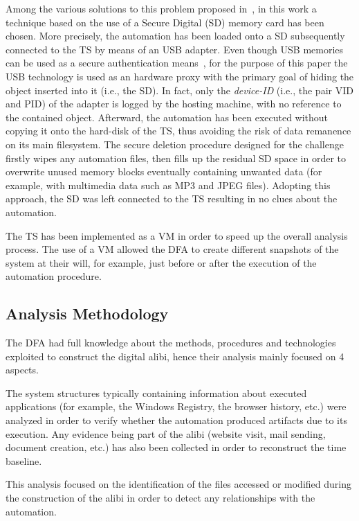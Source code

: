 \documentclass[10pt, conference]{IEEEtran}
\begin{document}
Among the various solutions to this problem proposed in~\cite{securedel}, in this work a technique based on the use of a Secure Digital
(SD) memory card has been chosen. More precisely, the automation has been loaded onto a SD subsequently connected to the TS by
means of an USB adapter. 
Even though USB memories can be used as a secure authentication means~\cite{jowua_usb}, for the purpose of this paper the USB technology is used as an hardware proxy with the primary goal of hiding the object inserted into it (i.e., the SD). In fact, only the \emph{device-ID} (i.e., the pair VID and PID) of the adapter is logged by the hosting machine, with no reference to the contained object.
Afterward, the automation has been executed without copying it onto the hard-disk of the TS, thus avoiding
the risk of data remanence on its main filesystem. The secure deletion procedure designed for the challenge firstly wipes any automation
files, then fills up the residual SD space in order to overwrite unused memory blocks eventually containing unwanted data (for example,
with multimedia data such as MP3 and JPEG files). Adopting this approach, the SD was left connected to the TS resulting in no clues
about the automation.

The TS has been implemented as a VM in order to speed up the overall analysis process. The use of a VM allowed
the DFA to create different snapshots of the system at their will, for example, just before or after the execution of the automation procedure.

\subsection{Analysis Methodology}
The DFA had full knowledge about the methods, procedures and technologies exploited to construct the digital alibi, hence their
analysis mainly focused on 4 aspects.

 The system structures typically containing information about executed
applications (for example, the Windows Registry, the browser history, etc.) were analyzed in order to verify whether the automation
produced artifacts due to its execution. Any evidence being part of the alibi (website visit, mail sending, document creation, etc.) has
also been collected in order to reconstruct the time baseline.

 This analysis focused on the identification of the files accessed or modified during the construction
of the alibi in order to detect any relationships with the automation.
\end{document}
